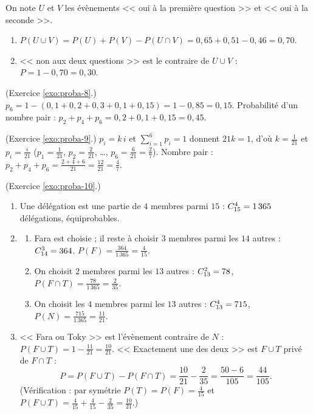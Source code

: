 \begin{corrige}
\begin{sol}
On note $U$ et $V$ les \'ev\`enements << oui \`a la premi\`ere question >> et << oui \`a la seconde >>.
\begin{enumerate}
\item $P(U\cup V) = P(U) + P(V) - P(U\cap V) = 0,65 + 0,51 - 0,46 = 0,70$.
\item << non aux deux questions >> est le contraire de $U\cup V$ : $P = 1 - 0,70 = 0,30$.
\end{enumerate}
\end{sol}
%
\begin{sol} (Exercice \ref{exo:proba-8}.)
$p_6 = 1 - (0,1 + 0,2 + 0,3 + 0,1 + 0,15) = 1 - 0,85 = 0,15$.
Probabilit\'e d'un nombre pair : $p_2 + p_4 + p_6 = 0,2 + 0,1 + 0,15 = 0,45$.
\end{sol}
%
\begin{sol} (Exercice \ref{exo:proba-9}.)
$p_i = k\,i$ et $\sum_{i=1}^{6} p_i = 1$ donnent $21k = 1$, d'o\`u $k = \frac{1}{21}$ et $p_i = \frac{i}{21}$
($p_1 = \frac{1}{21}$, $p_2 = \frac{2}{21}$, \ldots, $p_6 = \frac{6}{21} = \frac{2}{7}$).
Nombre pair : $p_2 + p_4 + p_6 = \frac{2+4+6}{21} = \frac{12}{21} = \frac{4}{7}$.
\end{sol}
%
\begin{sol} (Exercice \ref{exo:proba-10}.)
\begin{enumerate}
\item Une d\'el\'egation est une partie de $4$ membres parmi $15$ : $C_{15}^{4} = 1\,365$ d\'el\'egations, \'equiprobables.
\item \begin{enumerate}
      \item Fara est choisie ; il reste \`a choisir $3$ membres parmi les $14$ autres : $C_{14}^{3} = 364$.
            $P(F) = \frac{364}{1\,365} = \frac{4}{15}$.
      \item On choisit $2$ membres parmi les $13$ autres : $C_{13}^{2} = 78$, $P(F\cap T) = \frac{78}{1\,365} = \frac{2}{35}$.
      \item On choisit les $4$ membres parmi les $13$ autres : $C_{13}^{4} = 715$, $P(N) = \frac{715}{1\,365} = \frac{11}{21}$.
      \end{enumerate}
\item << Fara ou Toky >> est l'\'ev\`enement contraire de $N$ : $P(F\cup T) = 1 - \frac{11}{21} = \frac{10}{21}$.
      << Exactement une des deux >> est $F\cup T$ priv\'e de $F\cap T$ :
      \[
      P = P(F\cup T) - P(F\cap T) = \frac{10}{21} - \frac{2}{35} = \frac{50 - 6}{105} = \boxed{\frac{44}{105}} .
      \]
      (V\'erification : par sym\'etrie $P(T) = P(F) = \frac{4}{15}$ et $P(F\cup T) = \frac{4}{15}+\frac{4}{15}-\frac{2}{35} = \frac{10}{21}$.)

\end{enumerate}
\end{sol}
\end{corrige}
